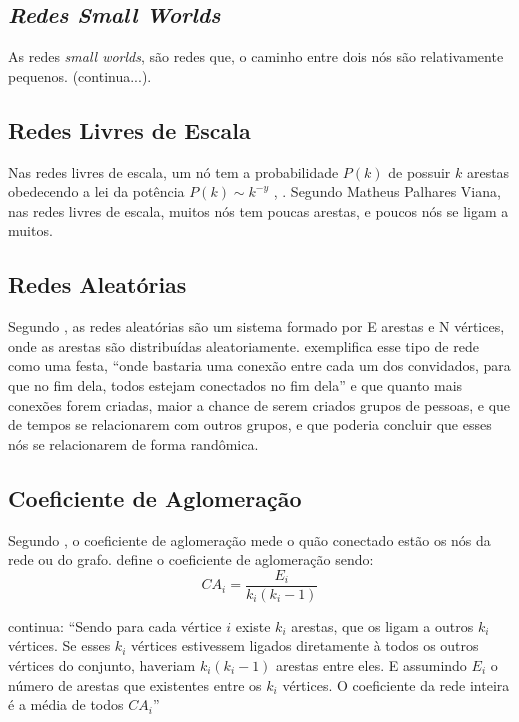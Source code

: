 \subsection{\textit{Redes Small Worlds}}
 As redes \textit{small worlds}, são redes que, o caminho entre dois nós são relativamente pequenos. (continua...).
 
 
 \subsection{Redes Livres de Escala}
 Nas redes livres de escala, um nó tem a probabilidade \(P(k)\) de possuir \(k\) arestas obedecendo a lei da potência \(P(k) \sim k^{-y}\) \cite{Albert2002}, \cite{Antiqueira2005}. Segundo Matheus Palhares Viana, nas redes livres de escala, muitos nós tem poucas arestas, e poucos nós se ligam a muitos.
 
     
\subsection{Redes Aleatórias}
Segundo \citet{Viana2007}, as redes aleatórias são um sistema formado por E arestas e N vértices, onde as arestas são distribuídas aleatoriamente. \citet{CunhaRecuero2004} exemplifica esse tipo de rede como uma festa, “onde bastaria uma conexão entre cada um dos convidados, para que no fim dela, todos estejam conectados no fim dela” e que quanto mais conexões forem criadas, maior a chance de serem criados grupos de pessoas, e que de tempos se relacionarem com outros grupos, e que poderia concluir que esses nós se relacionarem de forma randômica.

 
 \subsection{Coeficiente de Aglomeração}
 Segundo \citet{Viana2007}, o coeficiente de aglomeração mede o quão conectado estão os nós da rede ou do grafo. \citet{Antiqueira2005}  define o coeficiente de aglomeração sendo:\[CA_i = \frac{E_i}{k_i(k_i-1)}\]


    \citet{Antiqueira2005}  continua: “Sendo para cada vértice \(i\) existe \(k_i\) arestas, que os ligam a outros \(k_i\) vértices. Se esses \(k_i\) vértices estivessem ligados diretamente à todos os outros vértices do conjunto, haveriam \(k_i(k_i- 1)\) arestas entre eles. E assumindo \(E_i\) o número de arestas que existentes entre os \(k_i\) vértices.	O coeficiente da rede inteira é a média de todos \(CA_i\)”


